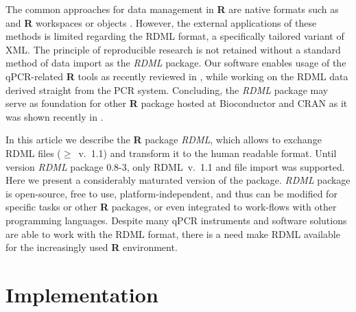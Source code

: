 \documentclass{bioinfo}
\begin{document}
The common approaches for data management in \textbf{R} are native formats such 
as and \textbf{R} workspaces or objects \cite{roediger_rkward_2012}. However, 
the external applications of these methods is limited regarding the RDML format, 
a specifically tailored variant of XML. The principle of reproducible research 
is not retained without a standard method of data import as the \textit{RDML} 
package. Our software enables usage of the qPCR-related \textbf{R} tools as 
recently reviewed in \cite{pabinger_2014}, while working on the RDML data 
derived straight from the PCR system. Concluding, the \textit{RDML} package may 
serve as foundation for other \textbf{R} package hosted at Bioconductor 
\cite{gentleman_2004} and CRAN as it was shown recently in \cite{roediger2015r}.

In this article we describe the \textbf{R} package \textit{RDML}, which 
allows to exchange RDML files ($\geq$~v.~1.1) and transform it to the human 
readable format. Until version \textit{RDML} package 0.8-3, only RDML~v.~1.1 and 
file import was supported. Here we present a considerably maturated version of 
the package. \textit{RDML} package is open-source, free to use, 
platform-independent, and thus can be modified for specific tasks or other 
\textbf{R} packages, or even integrated to work-flows with other programming 
languages. Despite many qPCR instruments and software solutions are able 
to work with the RDML format, there is a need make RDML available for the increasingly 
used \textbf{R} environment.

\section{Implementation}
	
\end{document}
